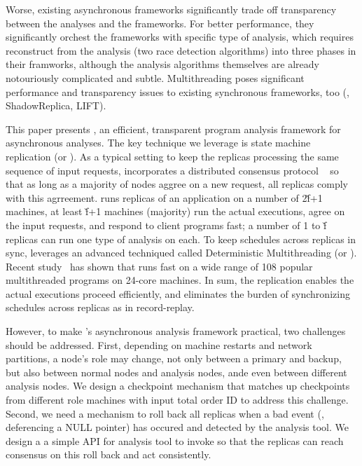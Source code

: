 Worse, existing asynchronous frameworks significantly trade off transparency 
between the analyses and the frameworks. For better performance, they 
significantly orchest the frameworks with specific type of analysis, which 
requires reconstruct from the analysis (two race detection algorithms) into 
three phases in their framworks, although the analysis algorithms themselves 
are already notouriously complicated and subtle. Multithreading poses 
significant performance and transparency issues to existing synchronous 
frameworks, too (\eg, ShadowReplica, LIFT).


This paper presents \xxx, an efficient, transparent program 
analysis framework for asynchronous analyses. The key technique we leverage is 
state machine replication (or \smr). As a typical \smr setting to keep the 
replicas processing the same sequence of input requests, \xxx incorporates a 
distributed consensus protocol \paxos~\cite{paxos} so that as long as a 
majority of nodes aggree on a new request, all replicas comply with this 
agrreement. \xxx runs replicas of an application on a number of 2\v{f}+1 
machines, at least \v{f}+1 machines (majority) run the actual executions, agree 
on the input requests, and respond to client programs fast; a number of 1 to 
\v{f} replicas can run one type of analysis on each. To keep 
schedules across replicas in sync, \repbox leverages an advanced techniqued 
called Deterministic Multithreading (or \dmt). Recent 
study~\cite{parrot:sosp13} has shown that \dmt runs fast on a wide range of 108 
popular multithreaded programs on 24-core machines. In sum, the \smr 
replication enables the actual executions proceed efficiently, and \dmt 
eliminates the burden of synchronizing schedules across replicas as in 
record-replay.


However, to make \xxx's asynchronous analysis framework practical, two 
challenges should be addressed. First, depending on machine restarts and 
network partitions, a node's role may change, not only between a \paxos primary 
and backup, but also between normal nodes and analysis nodes, ande even between 
different analysis nodes. We design a checkpoint mechanism that matches up 
checkpoints from different role machines with input total order ID to address 
this challenge. Second, we need a mechanism to roll back all replicas when a 
bad event (\eg, deferencing a NULL pointer) has occured and detected by the 
analysis tool. We design a a simple API for analysis tool to invoke so that the 
replicas can reach consensus on this roll back and act consistently.


